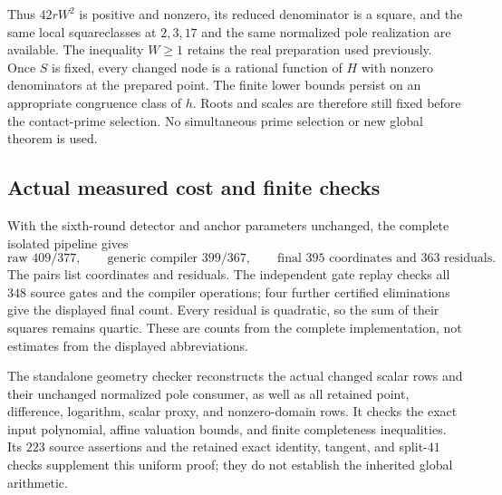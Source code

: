 Thus $42rW^2$ is positive and nonzero, its reduced denominator is a
square, and the same local squareclasses at $2,3,17$ and the same
normalized pole realization are available. The inequality $W\ge1$
retains the real preparation used previously. Once $S$ is fixed, every
changed node is a rational function of $H$ with nonzero denominators
at the prepared point. The finite lower bounds persist on an appropriate
congruence class of $h$. Roots and scales are therefore still fixed
before the contact-prime selection. No simultaneous prime selection
or new global theorem is used.

\subsection{Actual measured cost and finite checks}

With the sixth-round detector and anchor parameters unchanged, the
complete isolated pipeline gives
\[
 \text{raw }409/377,\qquad
 \text{generic compiler }399/367,\qquad
 \boxed{\text{final }395\text{ coordinates and }363\text{ residuals}}.
\]
The pairs list coordinates and residuals. The independent gate replay
checks all $348$ source gates and the compiler operations; four further
certified eliminations give the displayed final count. Every residual
is quadratic, so the sum of their squares remains quartic. These are
counts from the complete implementation, not estimates from the
displayed abbreviations.

The standalone geometry checker reconstructs the actual changed scalar
rows and their unchanged normalized pole consumer, as well as all
retained point, difference, logarithm, scalar proxy, and nonzero-domain
rows. It checks the exact input polynomial, affine valuation bounds,
and finite completeness inequalities. Its $223$ source assertions and
the retained exact identity, tangent, and split-$41$ checks supplement
this uniform proof; they do not establish the inherited global arithmetic.

